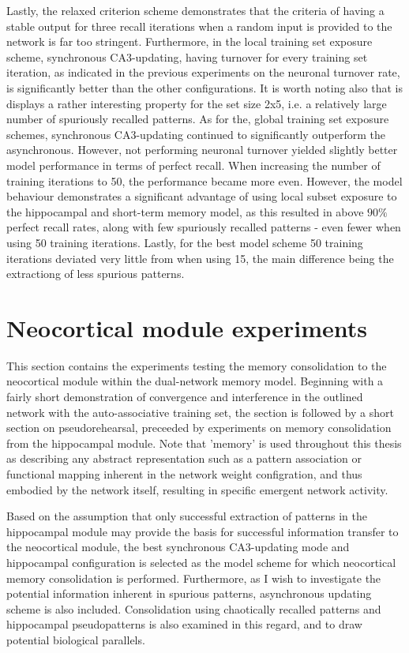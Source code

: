 Lastly, the relaxed criterion scheme demonstrates that the criteria of having a stable output for three recall iterations when a random input is provided to the network is far too stringent. Furthermore, in the local training set exposure scheme, synchronous CA3-updating, having turnover for every training set iteration, as indicated in the previous experiments on the neuronal turnover rate, is significantly better than the other configurations. It is worth noting also that is displays a rather interesting property for the set size 2x5, i.e. a relatively large number of spuriously recalled patterns. As for the, global training set exposure schemes, synchronous CA3-updating continued to significantly outperform the asynchronous. However, not performing neuronal turnover yielded slightly better model performance in terms of perfect recall. When increasing the number of training iterations to 50, the performance became more even. However, the model behaviour demonstrates a significant advantage of using local subset exposure to the hippocampal and short-term memory model, as this resulted in above $90 \%$ perfect recall rates, along with few spuriously recalled patterns - even fewer when using 50 training iterations. Lastly, for the best model scheme 50 training iterations deviated very little from when using 15, the main difference being the extractiong of less spurious patterns.




\section{Neocortical module experiments}

This section contains the experiments testing the memory consolidation to the neocortical module within the dual-network memory model. Beginning with a fairly short demonstration of convergence and interference in the outlined network with the auto-associative training set, the section is followed by a short section on pseudorehearsal, preceeded by experiments on memory consolidation from the hippocampal module. Note that 'memory' is used throughout this thesis as describing any abstract representation such as a pattern association or functional mapping inherent in the network weight configration, and thus embodied by the network itself, resulting in specific emergent network activity.

Based on the assumption that only successful extraction of patterns in the hippocampal module may provide the basis for successful information transfer to the neocortical module, the best synchronous CA3-updating mode and hippocampal configuration is selected as the model scheme for which neocortical memory consolidation is performed. Furthermore, as I wish to investigate the potential information inherent in spurious patterns, asynchronous updating scheme is also included. Consolidation using chaotically recalled patterns and hippocampal pseudopatterns is also examined in this regard, and to draw potential biological parallels.


